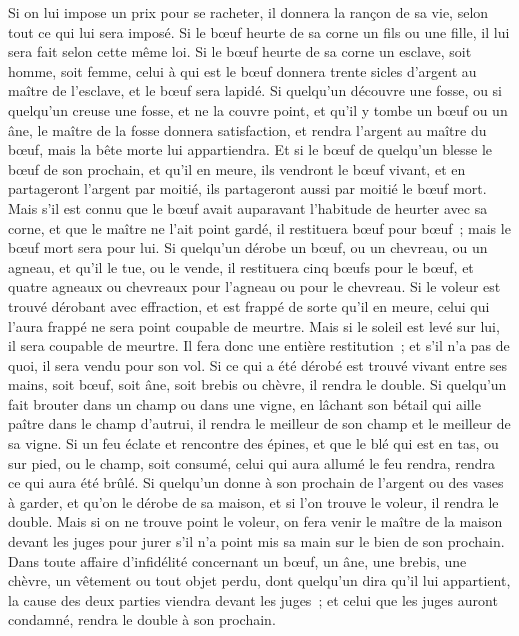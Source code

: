\begin{multicols}{2}
Si on lui impose un prix pour se racheter, il donnera la rançon de sa vie, selon tout ce qui lui sera imposé.
Si le bœuf heurte de sa corne un fils ou une fille, il lui sera fait selon cette même loi.
Si le bœuf heurte de sa corne un esclave, soit homme, soit femme, celui à qui est le bœuf donnera trente sicles d'argent au maître de l'esclave, et le bœuf sera lapidé.
Si quelqu'un découvre une fosse, ou si quelqu'un creuse une fosse, et ne la couvre point, et qu'il y tombe un bœuf ou un âne,
le maître de la fosse donnera satisfaction, et rendra l'argent au maître du bœuf, mais la bête morte lui appartiendra.
Et si le bœuf de quelqu'un blesse le bœuf de son prochain, et qu'il en meure, ils vendront le bœuf vivant, et en partageront l'argent par moitié, ils partageront aussi par moitié le bœuf mort.
Mais s'il est connu que le bœuf avait auparavant l'habitude de heurter avec sa corne, et que le maître ne l'ait point gardé, il restituera bœuf pour bœuf~; mais le bœuf mort sera pour lui.
\VerseOne{}Si quelqu'un dérobe un bœuf, ou un chevreau, ou un agneau, et qu'il le tue, ou le vende, il restituera cinq bœufs pour le bœuf, et quatre agneaux ou chevreaux pour l'agneau ou pour le chevreau.
Si le voleur est trouvé dérobant avec effraction, et est frappé de sorte qu'il en meure, celui qui l'aura frappé ne sera point coupable de meurtre.
Mais si le soleil est levé sur lui, il sera coupable de meurtre. Il fera donc une entière restitution~; et s'il n'a pas de quoi, il sera vendu pour son vol.
Si ce qui a été dérobé est trouvé vivant entre ses mains, soit bœuf, soit âne, soit brebis ou chèvre, il rendra le double.
Si quelqu'un fait brouter dans un champ ou dans une vigne, en lâchant son bétail qui aille paître dans le champ d'autrui, il rendra le meilleur de son champ et le meilleur de sa vigne.
Si un feu éclate et rencontre des épines, et que le blé qui est en tas, ou sur pied, ou le champ, soit consumé, celui qui aura allumé le feu rendra, rendra ce qui aura été brûlé.
Si quelqu'un donne à son prochain de l'argent ou des vases à garder, et qu'on le dérobe de sa maison, et si l'on trouve le voleur, il rendra le double.
Mais si on ne trouve point le voleur, on fera venir le maître de la maison devant les juges pour jurer s'il n'a point mis sa main sur le bien de son prochain.
Dans toute affaire d'infidélité concernant un bœuf, un âne, une brebis, une chèvre, un vêtement ou tout objet perdu, dont quelqu'un dira qu'il lui appartient, la cause des deux parties viendra devant les juges~; et celui que les juges auront condamné, rendra le double à son prochain.

\end{multicols}
